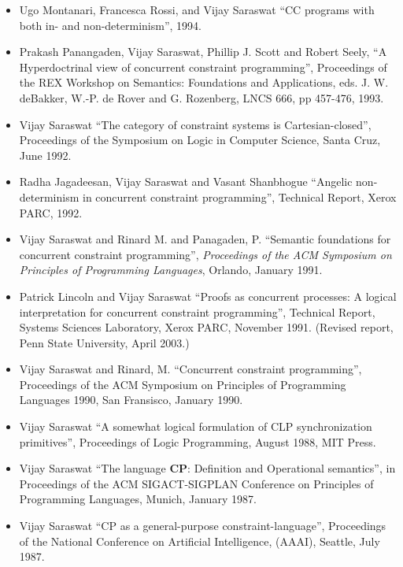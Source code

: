 \documentclass{article}
\begin{document}
\begin{itemize}
\item  Ugo Montanari, Francesca Rossi, and Vijay Saraswat ``CC
  programs with both in- and non-determinism'', 1994.

\item  Prakash Panangaden, Vijay Saraswat, Phillip J. Scott and
  Robert Seely, ``A Hyperdoctrinal view of concurrent constraint
  programming'', Proceedings of the REX Workshop on Semantics:
  Foundations and Applications, eds. J. W. deBakker, W.-P. de Rover
  and G. Rozenberg, LNCS 666, pp 457-476, 1993.
  
\item  Vijay Saraswat ``The category of constraint systems is
  Cartesian-closed'', Proceedings of the Symposium on Logic in
  Computer Science, Santa Cruz, June 1992.

\item Radha Jagadeesan, Vijay Saraswat and Vasant Shanbhogue ``Angelic
  non-determinism in concurrent constraint programming'', Technical
  Report, Xerox PARC, 1992.
  
\item  Vijay Saraswat and Rinard M. and Panagaden, P. ``Semantic
  foundations for concurrent constraint programming'', \textit{
  Proceedings of the ACM Symposium on Principles of Programming
  Languages}, Orlando, January 1991.
  
\item Patrick Lincoln and Vijay Saraswat ``Proofs as concurrent
  processes: A logical interpretation for concurrent constraint
  programming'', Technical Report, Systems Sciences Laboratory, Xerox
  PARC, November 1991. (Revised report, Penn State University, April
  2003.)
  
\item  Vijay Saraswat and Rinard, M. ``Concurrent constraint
  programming'', Proceedings of the ACM Symposium on
  Principles of Programming Languages 1990, San Fransisco, January
  1990.
  
\item  Vijay Saraswat ``A somewhat logical formulation of CLP
  synchronization primitives'', Proceedings of Logic Programming,
  August 1988, MIT Press.
  
\item  Vijay Saraswat ``The language \textbf{CP}: Definition and
  Operational semantics'', in Proceedings of the ACM
  SIGACT-SIGPLAN Conference on Principles of Programming
  Languages, Munich, January 1987.
  
\item  Vijay Saraswat ``\textsf{CP} as a general-purpose
  constraint-language'', Proceedings of the National
  Conference on Artificial Intelligence, (AAAI), Seattle, July
  1987.
  

\end{itemize}
\end{document}
